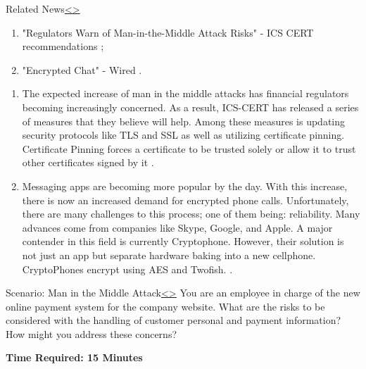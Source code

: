 \documentclass[12pt]{extarticle}
\newenvironment{instructionblock}{\Large\bgroup}{\egroup}
\newcommand{\ben}{\begin{enumerate}}
\newcommand{\een}{\end{enumerate}}
\begin{document}
\pagebreak



\pagebreak
\begin{slide}{Related News}{\hyperref[slide 4]{\textless}\hyperref[slide 6]{\textgreater}}
	\begin{instructionblock}
		\ben	
			\item "Regulators Warn of Man-in-the-Middle Attack Risks" - ICS CERT 					recommendations \cite{End-to-end};
			\item "Encrypted Chat" - Wired \cite{phone}.
		\een
	\end{instructionblock}
\end{slide}

\vspace*{40mm}
\ben
	\item The expected increase of man in the middle attacks has financial regulators becoming increasingly concerned. As a result, ICS-CERT has released a series of measures that they believe will help. Among these measures is updating security protocols like TLS and SSL as well as utilizing certificate pinning. Certificate Pinning forces a certificate to be trusted solely or allow it to trust other certificates signed by it \cite{End-to-end}.
	\item Messaging apps are becoming more popular by the day. With this increase, there is now an increased demand for encrypted phone calls. Unfortunately, there are many challenges to this process; one of them being: reliability. Many advances come from companies like Skype, Google, and Apple. A major contender in this field is currently Cryptophone. However, their solution is not just an app but separate hardware baking into a new cellphone. CryptoPhones encrypt using AES and Twofish. \cite{phone}.
	\een

\pagebreak


\pagebreak
\begin{slide}{Scenario: Man in the Middle Attack}{\hyperref[slide 5]{\textless}\hyperref[slide 7]{\textgreater}}
	\begin{instructionblock}
	You are an employee in charge of the new online payment system for the company website. What are the risks to be considered with the handling of customer personal and payment information? How might you address these concerns?
	\end{instructionblock}
\end{slide}
\begin{center}
	\textbf{Time Required: 15 Minutes}
\end{center}
\end{document}
